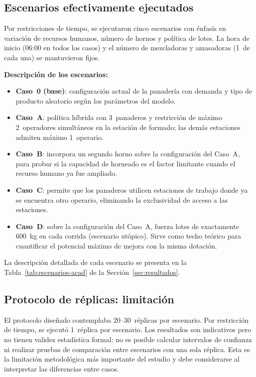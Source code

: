 \documentclass[12pt]{article}
\begin{document}
\subsection{Escenarios efectivamente ejecutados}

Por restricciones de tiempo, se ejecutaron cinco escenarios con énfasis en variación de recursos humanos, número de hornos y política de lotes. La hora de inicio (06:00 en todos los casos) y el número de mezcladoras y amasadoras (1~de cada una) se mantuvieron fijos.

\textbf{Descripción de los escenarios:}
\begin{itemize}
  \item \textbf{Caso~0 (base)}: configuración actual de la panadería con demanda y tipo de producto aleatorio según los parámetros del modelo.
  \item \textbf{Caso~A}: política híbrida con 3~panaderos y restricción de máximo 2~operadores simultáneos en la estación de formado; las demás estaciones admiten máximo 1~operario.
  \item \textbf{Caso~B}: incorpora un segundo horno sobre la configuración del Caso~A, para probar si la capacidad de horneado es el factor limitante cuando el recurso humano ya fue ampliado.
  \item \textbf{Caso~C}: permite que los panaderos utilicen estaciones de trabajo donde ya se encuentra otro operario, eliminando la exclusividad de acceso a las estaciones.
  \item \textbf{Caso~D}: sobre la configuración del Caso~A, fuerza lotes de exactamente 600~kg en cada corrida (escenario utópico). Sirve como techo teórico para cuantificar el potencial máximo de mejora con la misma dotación.
\end{itemize}

La descripción detallada de cada escenario se presenta en la Tabla~\ref{tab:escenarios-acad} de la Sección~\ref{sec:resultados}.

\subsection{Protocolo de réplicas: limitación}

El protocolo diseñado contemplaba 20--30~réplicas por escenario. Por restricción de tiempo, se ejecutó 1~réplica por escenario. Los resultados son indicativos pero no tienen validez estadística formal: no es posible calcular intervalos de confianza ni realizar pruebas de comparación entre escenarios con una sola réplica. Esta es la limitación metodológica más importante del estudio y debe considerarse al interpretar las diferencias entre casos.
\end{document}
